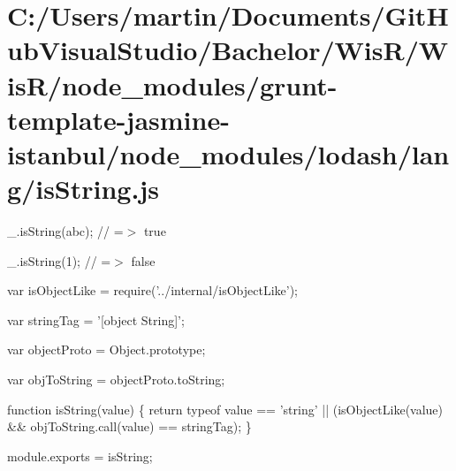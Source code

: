 \hypertarget{_c_1_2_users_2martin_2_documents_2_git_hub_visual_studio_2_bachelor_2_wis_r_2_wis_r_2node_modulee1694adb8cbdedb57a4f5b2bd1a8a912}{}\section{C\+:/\+Users/martin/\+Documents/\+Git\+Hub\+Visual\+Studio/\+Bachelor/\+Wis\+R/\+Wis\+R/node\+\_\+modules/grunt-\/template-\/jasmine-\/istanbul/node\+\_\+modules/lodash/lang/is\+String.\+js}
\+\_\+.\+is\+String(\textquotesingle{}abc\textquotesingle{}); // =$>$ true

\+\_\+.\+is\+String(1); // =$>$ false


\begin{DoxyCodeInclude}
var isObjectLike = require(\textcolor{stringliteral}{'../internal/isObjectLike'});

var stringTag = \textcolor{stringliteral}{'[object String]'};

var objectProto = Object.prototype;

var objToString = objectProto.toString;

\textcolor{keyword}{function} isString(value) \{
  \textcolor{keywordflow}{return} typeof value == \textcolor{stringliteral}{'string'} || (isObjectLike(value) && objToString.call(value) == stringTag);
\}

module.exports = isString;
\end{DoxyCodeInclude}
 